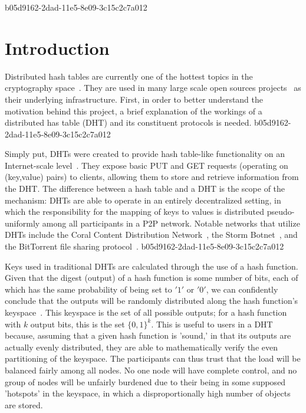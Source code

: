 \documentclass[12pt]{article}
\begin{document}
b05d9162-2dad-11e5-8e09-3c15c2c7a012\section{Introduction}
\par Distributed hash tables are currently one of the hottest topics in the cryptography space~\cite{Stoica:2001dj,Rowstron:2001ea,Ratnasamy:2001wn}. They are used in many large scale open sources projects~\cite{Freitas:2013tb,Xu:2010vs,Perfitt:2010fh} as their underlying infrastructure. First, in order to better understand the motivation behind this project, a brief explanation of the workings of a distributed has table (DHT) and its constituent protocols is needed.
b05d9162-2dad-11e5-8e09-3c15c2c7a012
\par Simply put, DHTs were created to provide hash table-like functionality on an Internet-scale level~\cite{Ratnasamy:2001wn}. They expose basic PUT and GET requests (operating on (key,value) pairs) to clients, allowing them to store and retrieve information from the DHT. The difference between a hash table and a DHT is the scope of the mechanism: DHTs are able to operate in an entirely decentralized setting, in which the responsibility for the mapping of keys to values is distributed pseudo-uniformly among all participants in a P2P network. Notable networks that utilize DHTs include the Coral Content Distribution Network~\cite{Freedman:2004vb}, the Storm Botnet~\cite{Holz:2008uk}, and the BitTorrent file sharing protocol~\cite{Cohen:y1_8mBnw}.
b05d9162-2dad-11e5-8e09-3c15c2c7a012
\par Keys used in traditional DHTs are calculated through the use of a hash function. Given that the digest (output) of a hash function is some number of bits, each of which has the same probability of being set to $'1'$ or $'0'$, we can confidently conclude that the outputs will be randomly distributed along the hash function's keyspace~. This keyspace is the set of all possible outputs; for a hash function with $k$ output bits, this is the set $\{0,1\}^k$. This is useful to users in a DHT because, assuming that a given hash function is 'sound,' in that its outputs are actually evenly distributed, they are able to mathematically verify the even partitioning of the keyspace. The participants can thus trust that the load will be balanced fairly among all nodes. No one node will have complete control, and no group of nodes will be unfairly burdened due to their being in some supposed 'hotspots' in the keyspace, in which a disproportionally high number of objects are stored.~
\end{document}
